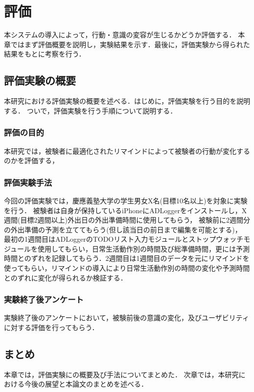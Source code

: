 \chapter{評価}
本システムの導入によって，行動・意識の変容が生じるかどうか評価する．
本章ではまず評価概要を説明し，実験結果を示す．最後に，評価実験から得られた結果をもとに考察を行う．

\section{評価実験の概要}
本研究における評価実験の概要を述べる．はじめに，評価実験を行う目的を説明する．
ついで，評価実験を行う手順について説明する．

\subsection{評価の目的}
本研究では，被験者に最適化されたリマインドによって被験者の行動が変化するのかを評価する，

\subsection{評価実験手法}
今回の評価実験では，慶應義塾大学の学生男女X名(目標10名以上)を対象に実験を行う．
被験者は自身が保持しているiPhoneにADLoggerをインストールし，X週間(目標2週間以上)外出日の外出準備時間に使用してもらう，
被験前に2週間分の外出準備の予測を立ててもらう(但し該当日の前日まで編集を可能とする)，
最初の1週間目はADLoggerのTODOリスト入力モジュールとストップウォッチモジュールを使用してもらい，日常生活動作別の時間及び総準備時間，更には予測時間とのずれを記録してもらう．2週間目は1週間目のデータを元にリマインドを使ってもらい，リマインドの導入により日常生活動作別の時間の変化や予測時間とのずれに変化が得られるか検証する．

\subsection{実験終了後アンケート}
実験終了後のアンケートにおいて，被験前後の意識の変化，及びユーザビリティに対する評価を行ってもらう．%

\section{まとめ}
本章では，評価実験にの概要及び手法についてまとめた．
次章では，本研究における今後の展望と本論文のまとめを述べる．

